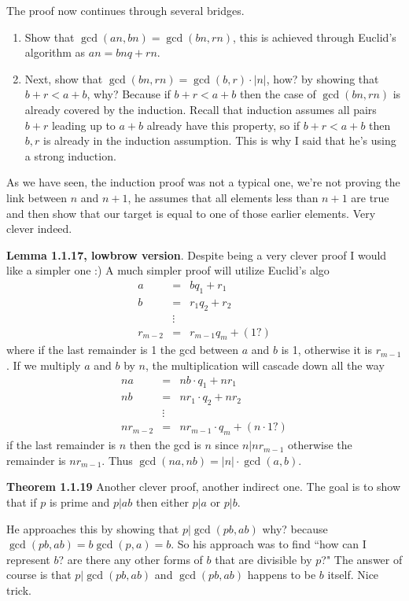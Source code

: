 \documentclass[aps,preprint,preprintnumbers,nofootinbib,showpacs,prd]{revtex4-1}
\newcommand{\nbea}{\begin{eqnarray*}}
\newcommand{\neea}{\end{eqnarray*}}
\begin{document}
The proof now continues through several bridges. 
\begin{enumerate}
\item Show that $\gcd(an,bn) = \gcd(bn,rn)$, this is achieved through Euclid's algorithm as $an = bnq + rn$.
\item Next, show that $\gcd(bn, rn) = \gcd(b,r) \cdot |n|$, how? by showing that $b + r < a + b$, why? Because if $b + r < a + b$ then the case of $\gcd(bn, rn)$ is already covered by the induction. Recall that induction assumes all pairs $b + r$ leading up to $a + b$ already have this property, so if $b + r < a + b$ then $b,r$ is already in the induction assumption. This is why I said that he's using a strong induction.
\end{enumerate}
As we have seen, the induction proof was not a typical one, we're not proving the link between $n$ and $n+1$, he assumes that all elements less than $n+1$ are true and then show that our target is equal to one of those earlier elements. Very clever indeed.

{\bf Lemma 1.1.17,  lowbrow version}. Despite being a very clever proof I would like a simpler one :) A much simpler proof will utilize Euclid's algo
%
\nbea
a & = & bq_1 + r_1 \\
b & = & r_1q_2 + r_2 \\
& \vdots & \\
r_{m-2} & = & r_{m-1} q_m + (1?)
\neea
%
where if the last remainder is 1 the gcd between $a$ and $b$ is 1, otherwise it is $r_{m-1}$. If we multiply $a$ and $b$ by $n$, the multiplication will cascade down all the way
%
\nbea
na & = & nb \cdot q_1 + nr_1 \\
nb & = & nr_1 \cdot q_2 + nr_2 \\
& \vdots & \\
nr_{m-2} & = & nr_{m-1} \cdot q_m + (n \cdot 1?)
\neea
%
if the last remainder is $n$ then the gcd is $n$ since $ n | nr_{m-1}$ otherwise the remainder is $nr_{m-1}$. Thus $\gcd(na,nb) = |n| \cdot \gcd(a,b)$.

{\bf Theorem 1.1.19} Another clever proof, another indirect one. The goal is to show that if $p$ is prime and $p|ab$ then either $p|a$ or $p|b$.

He approaches this by showing that $p|\gcd(pb, ab)$ why? because $\gcd(pb, ab) = b\gcd(p, a) = b$. So his approach was to find ``how can I represent $b$? are there any other forms of $b$ that are divisible by $p$?" The answer of course is that $p|\gcd(pb, ab)$ and $\gcd(pb, ab)$ happens to be $b$ itself. Nice trick.
\end{document}
